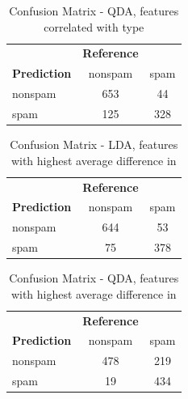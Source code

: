 \documentclass{article}\usepackage[]{graphicx}\usepackage[]{xcolor}
\begin{document}
\begin{table}[h]
	\centering
	\begin{tabular}{lcc}
		& \textbf{Reference} & \\
		\textbf{Prediction} & nonspam & spam \\
		nonspam & 653 & 44 \\
		spam & 125 & 328 \\
	\end{tabular}
	\caption{Confusion Matrix - QDA, features correlated with type}
	\label{tab:confusion_matrix_qda4}
\end{table}

\begin{table}[h]
 	\centering
 	\begin{tabular}{lcc}
 		& \textbf{Reference} & \\
 		\textbf{Prediction} & nonspam & spam \\
 		nonspam & 644 & 53 \\
 		spam & 75 & 378 \\
 	\end{tabular}
 	\caption{Confusion Matrix - LDA, features with highest average difference in}
 	\label{tab:confusion_matrix_lda5}
 \end{table}
 
 \begin{table}[h]
 	\centering
 	\begin{tabular}{lcc}
 		& \textbf{Reference} & \\
 		\textbf{Prediction} & nonspam & spam \\
 		nonspam & 478 & 219 \\
 		spam & 19 & 434 \\
 	\end{tabular}
 	\caption{Confusion Matrix - QDA, features with highest average difference in}
 	\label{tab:confusion_matrix_qda5}
\end{table}
\end{document}
